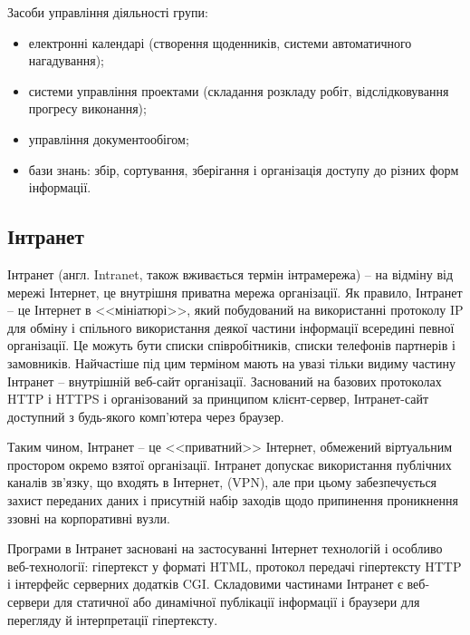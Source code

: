 Засоби управління діяльності групи:
\begin{itemize}
\item електронні календарі (створення щоденників, системи автоматичного нагадування);
\item системи управління проектами (складання розкладу робіт, відслідковування прогресу виконання);
\item управління документообігом;
\item бази знань: збір, сортування, зберігання і організація доступу до різних форм інформації.
\end{itemize}





\subsection{Інтранет}
Інтранет (англ. Intranet, також вживається термін інтрамережа) -- на відміну від мережі Інтернет, це внутрішня приватна мережа організації. 
Як правило, Інтранет -- це Інтернет в <<мініатюрі>>, який побудований на використанні протоколу IP для обміну і спільного використання деякої частини інформації всередині певної організації. 
Це можуть бути списки співробітників, списки телефонів партнерів і замовників. 
Найчастіше під цим терміном мають на увазі тільки видиму частину Інтранет -- внутрішній веб-сайт організації. 
Заснований на базових протоколах HTTP і HTTPS і організований за принципом клієнт-сервер, Інтранет-сайт доступний з будь-якого комп'ютера через браузер. 
\par Таким чином, Інтранет -- це <<приватний>> Інтернет, обмежений віртуальним простором окремо взятої організації. 
Інтранет допускає використання публічних каналів зв'язку, що входять в Інтернет, (VPN), але при цьому забезпечується захист переданих даних і присутній набір заходів щодо припинення проникнення ззовні на корпоративні вузли.
\par Програми в Інтранет засновані на застосуванні Інтернет технологій і особливо веб-технології: гіпертекст у форматі HTML, протокол передачі гіпертексту HTTP і інтерфейс серверних додатків CGI. 
Складовими частинами Інтранет є веб-сервери для статичної або динамічної публікації інформації і браузери для перегляду й інтерпретації гіпертексту.


